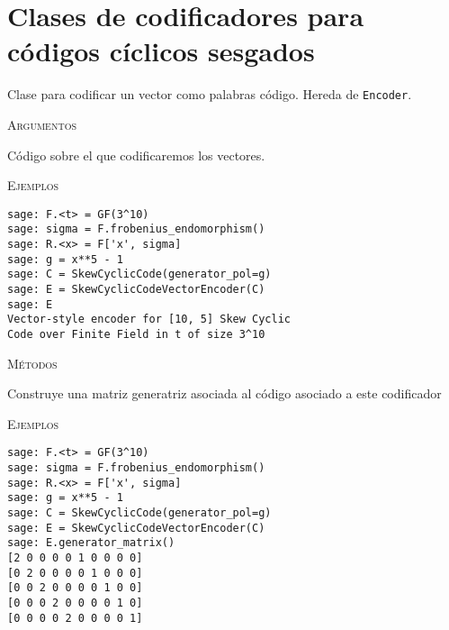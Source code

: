 \section{Clases de codificadores para códigos cíclicos sesgados}

\begin{description}[font=\ttfamily, style=nextline]
    \item[class SkewCyclicCodeVectorEncoder(self, code)]
    Clase para codificar un vector como palabras código. Hereda de \texttt{Encoder}.

    \textsc{Argumentos}

    \begin{description}[font=\ttfamily, style=nextline]
        \item[code]
        Código sobre el que codificaremos los vectores.

    \end{description}

    \textsc{Ejemplos}

    \begin{lstlisting}
sage: F.<t> = GF(3^10)
sage: sigma = F.frobenius_endomorphism()
sage: R.<x> = F['x', sigma]
sage: g = x**5 - 1
sage: C = SkewCyclicCode(generator_pol=g)
sage: E = SkewCyclicCodeVectorEncoder(C)
sage: E
Vector-style encoder for [10, 5] Skew Cyclic
Code over Finite Field in t of size 3^10
    \end{lstlisting}

    \textsc{Métodos}

    \begin{description}[font=\ttfamily, style=nextline]
        \item[generator\_matrix(self)]
        Construye una matriz generatriz asociada al código asociado a este codificador

        \textsc{Ejemplos}
    \begin{lstlisting}
sage: F.<t> = GF(3^10)
sage: sigma = F.frobenius_endomorphism()
sage: R.<x> = F['x', sigma]
sage: g = x**5 - 1
sage: C = SkewCyclicCode(generator_pol=g)
sage: E = SkewCyclicCodeVectorEncoder(C)
sage: E.generator_matrix()
[2 0 0 0 0 1 0 0 0 0]
[0 2 0 0 0 0 1 0 0 0]
[0 0 2 0 0 0 0 1 0 0]
[0 0 0 2 0 0 0 0 1 0]
[0 0 0 0 2 0 0 0 0 1]
    \end{lstlisting}
    \end{description}

\end{description}

